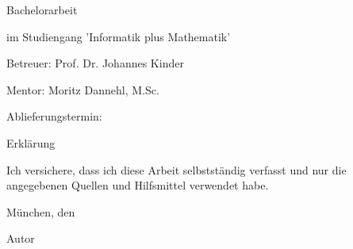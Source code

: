 \documentclass[12pt,letterpaper,ngerman]{article}
\begin{document}
\date{\vspace{-5ex}}
{\let\newpage\relax\maketitle}
\thispagestyle{empty}
\begin{center}
\begin{large}
\begin{Large}
Bachelorarbeit
\end{Large}
im Studiengang 'Informatik plus Mathematik' 
\end{large}
\end{center}
\vspace{1cm}
\begin{center}
\begin{large}
Betreuer: Prof. Dr. Johannes Kinder
\end{large}
\end{center}
\begin{center}
\begin{large}
Mentor: Moritz Dannehl, M.Sc.
\end{large}
\end{center}


\begin{center}
\begin{large}
Ablieferungstermin: \date{20. Januar 2025} 
\end{large}
\end{center}


\vspace*{0.8\textheight}
\noindent
\makeatletter
\begin{center}
  {\normalfont\bfseries} Erklärung
\end{center}
\begin{flushleft}
Ich versichere, dass ich diese Arbeit selbstständig verfasst
und nur die angegebenen Quellen und Hilfsmittel verwendet habe.
\makeatother

\vspace{15mm}
\noindent
München, den \date{\today} \hspace{50mm} Autor
\end{flushleft}
\cleardoublepage{}

\vspace*{20mm}
\end{document}
